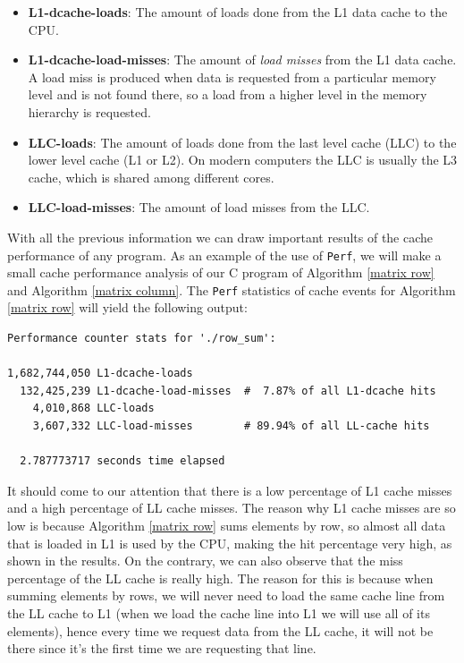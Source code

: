 \documentclass[12pt]{diicc}
\begin{document}
\begin{itemize}
\item \textbf{L1-dcache-loads}: The amount of loads done from the L1 data cache to the CPU.
\item \textbf{L1-dcache-load-misses}: The amount of \textit{load misses} from the L1 data cache. A load miss is produced when data is requested from a particular memory level and is not found there, so a load from a higher level in the memory hierarchy is requested.
\item \textbf{LLC-loads}: The amount of loads done from the last level cache (LLC) to the lower level cache (L1 or L2). On modern computers the LLC is usually the L3 cache, which is shared among different cores.
\item \textbf{LLC-load-misses}: The amount of load misses from the LLC.
\end{itemize}

With all the previous information we can draw important results of the cache performance of any program. As an example of the use of \texttt{Perf}, we will make a small cache performance analysis of our C program of Algorithm \ref{matrix row} and Algorithm \ref{matrix column}. The \texttt{Perf} statistics of cache events for Algorithm \ref{matrix row} will yield the following output:

\begin{verbatim}
Performance counter stats for './row_sum':

1,682,744,050 L1-dcache-loads                                     
  132,425,239 L1-dcache-load-misses  #  7.87% of all L1-dcache hits
    4,010,868 LLC-loads              
    3,607,332 LLC-load-misses        # 89.94% of all LL-cache hits

  2.787773717 seconds time elapsed
\end{verbatim}

It should come to our attention that there is a low percentage of L1 cache misses and a high percentage of LL cache misses. The reason why L1 cache misses are so low is because Algorithm \ref{matrix row} sums elements by row, so almost all data that is loaded in L1 is used by the CPU, making the hit percentage very high, as shown in the results. On the contrary, we can also observe that the miss percentage of the LL cache is really high. The reason for this is because when summing elements by rows, we will never need to load the same cache line from the LL cache to L1 (when we load the cache line into L1 we will use all of its elements), hence every time we request data from the LL cache, it will not be there since it's the first time we are requesting that line.
\end{document}
